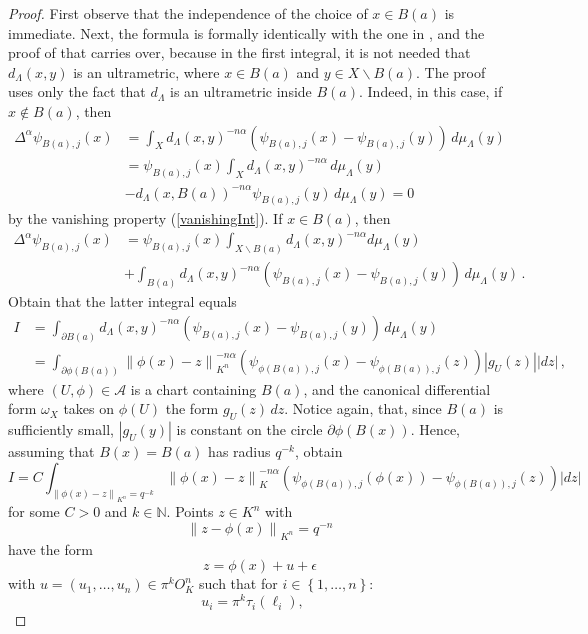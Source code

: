 \documentclass[a4paper,draft]{ZbRad}
\theoremstyle{plain}
\theoremstyle{definition}
\numberwithin{equation}{section}
\renewcommand{\setminus}{\smallsetminus}
\newcommand{\mathset}[1]{{\left\{#1\right\}}}
\newcommand{\absolute}[1]{\left\lvert#1\right\rvert}
\newcommand{\norm}[1]{\left\|#1\right\|}
\begin{document}
\begin{proof}
First observe that the independence of the
choice of $x\in B(a)$ is immediate. Next, the formula is formally identically
with the one in \cite[Theorem 3]{Kozyrev2004}, and the proof of that carries over, because
in the first integral, it is not needed that $d_\Lambda(x, y)$ is an ultrametric, where
$x \in B(a)$ and $y \in X \setminus B(a)$. The proof uses only the fact that $d_\Lambda$ is an
ultrametric inside $B(a)$. Indeed, in this case, if $x\notin B(a)$, then
\begin{align*}
\Delta^\alpha\psi_{B(a),j} (x) &=
\int_X d_\Lambda(x,y)^{-n\alpha} (\psi_{B(a),j} (x) - \psi_{B(a),j} (y))\,d\mu_\Lambda(y)
\\
&= \psi_{B(a),j} (x)
\int_X d_\Lambda(x,y)^{-n\alpha} \,d\mu_\Lambda(y)
\\
&- d_\Lambda(x,B(a))^{-n\alpha}
\psi_{B(a),j}(y)\, d\mu_\Lambda (y) = 0
\end{align*}
by the vanishing property (\ref{vanishingInt}). If $x\in B(a)$, then
\begin{align*}
\Delta^\alpha\psi_{B(a),j}(x)
&=
\psi_{B(a),j}(x)
\int_{X\setminus B(a)}
d_\Lambda(x,y)^{-n\alpha} d\mu_\Lambda(y)
\\
&+
\int_{B(a)}d_\Lambda(x,y)^{-n\alpha} (\psi_{B(a),j}(x) - \psi_{B(a),j}(y))\, d\mu_\Lambda(y)\,.
\end{align*}
Obtain that the latter integral equals
\begin{align*}
I&=
\int_{\partial B(a)}
d_\Lambda(x,y)^{-n\alpha}(\psi_{B(a),j}(x)-\psi_{B(a),j}(y))\,d\mu_\Lambda(y)
\\
&=
\int_{\partial\phi(B(a))}
\norm{\phi(x) - z}_{K^n}^{-n\alpha}
(\psi_{\phi(B(a)),j}(x) - \psi_{\phi(B(a)),j}(z))
\absolute{g_U(z)}\absolute{dz}\,,
\end{align*}
where $(U,\phi)\in\mathcal{A}$ is a chart containing $B(a)$, and the canonical differential form $\omega_X$ takes on $\phi(U )$ the form $g_U(z)\,dz$. Notice again, that, since $B(a)$ is sufficiently small,
$\absolute{g_U(y)}$ is constant on the circle $\partial\phi(B(x))$. Hence, assuming that $B(x) =
B(a)$ has radius $q^{-k}$, obtain
\[
I = C\int_{\norm{\phi(x) - z}_{K^n}=q^{-k}}
\norm{\phi(x)-z}_K^{-n\alpha}
(\psi_{\phi(B(a)),j} (\phi(x)) - \psi_{\phi(B(a)),j} (z)) \absolute{dz}
\]
for some $C > 0$ and $k\in\mathbb{N}$. Points $z \in K^n$ with
\[
\norm{z-\phi(x)}_{K^n}=q^{-n}
\]
have the form
\[
z=\phi(x) + u + \epsilon
\]
with $u = (u_1,\dots,u_n) \in\pi^k O_K^n$
such that for $i\in\mathset{1,\dots,n}$:
\[
u_i = \pi^k\tau_i(\ell_i),\quad
\]
\end{proof}
\end{document}
